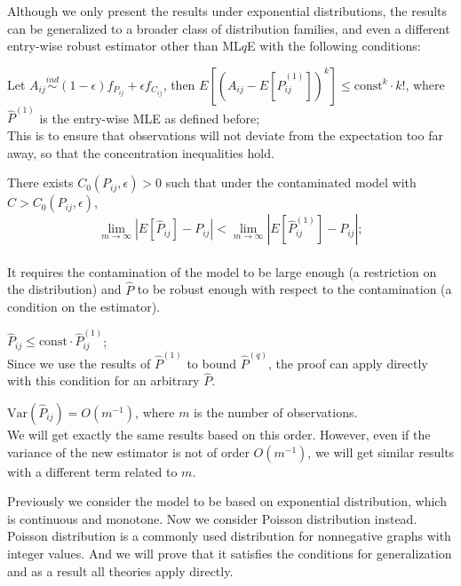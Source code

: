 \documentclass[simplex.tex]{subfiles}
\begin{document}
Although we only present the results under exponential distributions, the results can be generalized to a broader class of distribution families, and even a different entry-wise robust estimator other than ML$q$E with the following conditions:
\begin{compactenum}
\item Let $A_{ij} \stackrel{ind}{\sim} (1-\epsilon) f_{P_{ij}} + \epsilon f_{C_{ij}}$, then $E[(A_{ij} - E[\hat{P}_{ij}^{(1)}])^k] \le \mathrm{const}^k \cdot k!$, where $\hat{P}^{(1)}$ is the entry-wise MLE as defined before;\\
This is to ensure that observations will not deviate from the expectation too far away, so that the concentration inequalities hold.
\item There exists $C_0(P_{ij}, \epsilon) > 0$ such that under the contaminated model with $C > C_0(P_{ij}, \epsilon)$,
\[
	\lim_{m \to \infty} \left| E[\hat{P}_{ij}] - P_{ij} \right| < 
    \lim_{m \to \infty} \left| E[\hat{P}^{(1)}_{ij}] - P_{ij} \right|;
\]\\
It requires the contamination of the model to be large enough (a restriction on the distribution) and $\hat{P}$ to be robust enough with respect to the contamination (a condition on the estimator).
\item $\hat{P}_{ij} \le \mathrm{const} \cdot \hat{P}_{ij}^{(1)}$;\\
Since we use the results of $\hat{P}^{(1)}$ to bound $\hat{P}^{(q)}$, the proof can apply directly with this condition for an arbitrary $\hat{P}$.
\item $\mathrm{Var}(\hat{P}_{ij}) = O(m^{-1})$, where $m$ is the number of observations.\\
We will get exactly the same results based on this order. However, even if the variance of the new estimator is not of order $O(m^{-1})$, we will get similar results with a different term related to $m$.
\end{compactenum}

Previously we consider the model to be based on exponential distribution, which is continuous and monotone. Now we consider Poisson distribution instead. Poisson distribution is a commonly used distribution for nonnegative graphs with integer values. And we will prove that it satisfies the conditions for generalization and as a result all theories apply directly.
\end{document}
